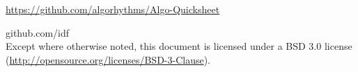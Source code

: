 \onecolumn
\begin{titlepage}

\url{https://github.com/algorhythms/Algo-Quicksheet}

\end{titlepage}

\newpage

\noindent {} github.com/idf \\
Except where otherwise noted, this document is licensed under a BSD 3.0
license \\ (\url{http://opensource.org/licenses/BSD-3-Clause}).
